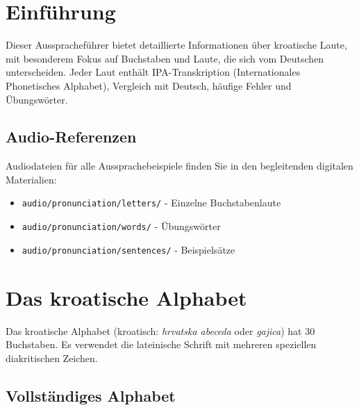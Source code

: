 
\section{Einführung}

Dieser Ausspracheführer bietet detaillierte Informationen über kroatische Laute, mit besonderem Fokus auf Buchstaben und Laute, die sich vom Deutschen unterscheiden. Jeder Laut enthält IPA-Transkription (Internationales Phonetisches Alphabet), Vergleich mit Deutsch, häufige Fehler und Übungswörter.

\subsection{Audio-Referenzen}

Audiodateien für alle Aussprachebeispiele finden Sie in den begleitenden digitalen Materialien:
\begin{itemize}
    \item \small\texttt{audio/pronunciation/letters/} - Einzelne Buchstabenlaute
    \item \small\texttt{audio/pronunciation/words/} - Übungswörter
    \item \small\texttt{audio/pronunciation/sentences/} - Beispielsätze
\end{itemize}

\section{Das kroatische Alphabet}

Das kroatische Alphabet (kroatisch: \textit{hrvatska abeceda} oder \textit{gajica}) hat 30 Buchstaben. Es verwendet die lateinische Schrift mit mehreren speziellen diakritischen Zeichen.

\subsection{Vollständiges Alphabet}

